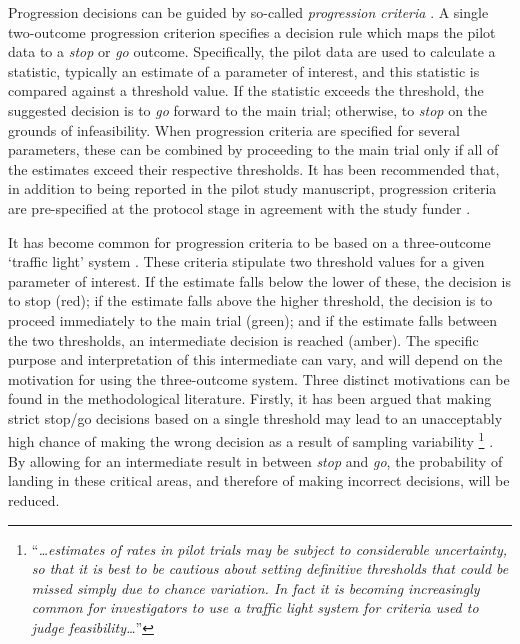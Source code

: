 \documentclass[sagev]{sagej}
\begin{document}
Progression decisions can be guided by so-called \emph{progression criteria} \cite{Eldridge2016a}. A single two-outcome progression criterion specifies a decision rule which maps the pilot data to a \emph{stop} or \emph{go} outcome. Specifically, the pilot data are used to calculate a statistic, typically an estimate of a parameter of interest, and this statistic is compared against a threshold value. If the statistic exceeds the threshold, the suggested decision is to \emph{go} forward to the main trial; otherwise, to \emph{stop} on the grounds of infeasibility. When progression criteria are specified for several parameters, these can be combined by proceeding to the main trial only if all of the estimates exceed their respective thresholds. It has been recommended that, in addition to being reported in the pilot study manuscript, progression criteria are pre-specified at the protocol stage in agreement with the study funder \cite{NIHR2017, Mbuagbaw2019}.

It has become common for progression criteria to be based on a three-outcome `traffic light' system \cite{Avery2017}. These criteria stipulate two threshold values for a given parameter of interest. If the estimate falls below the lower of these, the decision is to stop (red); if the estimate falls above the higher threshold, the decision is to proceed immediately to the main trial (green); and if the estimate falls between the two thresholds, an intermediate decision is reached (amber). The specific purpose and interpretation of this intermediate can vary, and will depend on the motivation for using the three-outcome system. Three distinct motivations can be found in the methodological literature. Firstly, it has been argued that making strict stop/go decisions based on a single threshold  may lead to an unacceptably high chance of making the wrong decision as a result of sampling variability \footnote{``\emph{\ldots estimates of rates in pilot trials may be subject to considerable uncertainty, so that it is best to be cautious about setting definitive thresholds that could be missed simply due to chance variation. In fact it is becoming increasingly common for investigators to use a traffic light system for criteria used to judge feasibility\ldots}''} \cite{Eldridge2016a}. By allowing for an intermediate result in between \emph{stop} and \emph{go}, the probability of landing in these critical areas, and therefore of making incorrect decisions, will be reduced.

\end{document}
